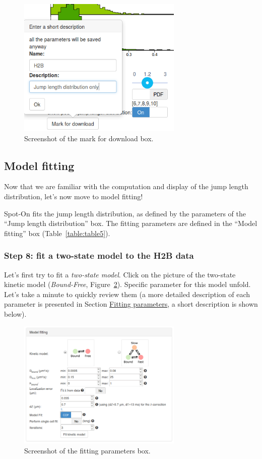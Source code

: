 \begin{figure}[h!]
\centering
\includegraphics[width=0.7\textwidth]{../SPTGUI/static/SPTGUI/img/tutorial/0.7/tuto9.png}
\caption{\label{fig:tuto9}Screenshot of the mark for download box.}
\end{figure}

\subsection{Model fitting}
Now that we are familiar with the computation and display of the jump length distribution, let's now move to model fitting!

Spot-On fits the jump length distribution, as defined by the parameters of the ``Jump length distribution'' box. The fitting parameters are defined in the ``Model fitting'' box (Table~\ref{table:table5}).

\subsubsection{Step 8: fit a two-state model to the H2B data}
Let's first try to fit a \textit{two-state model}. Click on the picture of the two-state kinetic model (\textit{Bound-Free}, Figure~\ref{fig:tuto10}). Specific parameter for this model unfold. Let's take a minute to quickly review them (a more detailed description of each parameter is presented in Section \href{https://spoton.berkeley.edu/SPTGUI/docs/latest#fit-parameters}{Fitting parameters}, a short description is shown below).

\begin{figure}[h!]
\centering
\includegraphics[width=0.7\textwidth]{../SPTGUI/static/SPTGUI/img/tutorial/0.7/tuto10.png}
\caption{\label{fig:tuto10}Screenshot of the fitting parameters box.}
\end{figure}

